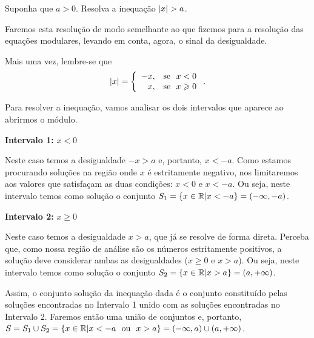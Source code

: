 \begin{exem}
   Suponha que $a> 0$. Resolva a inequação $\left|x\right| > a$.

Faremos esta resolução de modo semelhante ao que fizemos para a resolução das equações modulares, levando em conta, agora, o sinal da desigualdade.

Mais uma vez, lembre-se que 
 \[
\left|x\right|= \left\{\begin{array}{rl}
      -x , & \text{se} \ \ x<0 \\
      x , & \text{se} \ \ x \geqslant 0
     \end{array}\right. .
\]

Para resolver a inequação, vamos analisar os dois intervalos que aparece ao abrirmos o módulo.

\textbf{Intervalo 1:} $x < 0$

Neste caso temos a desigualdade $-x > a$ e, portanto, $x < -a$. Como estamos procurando soluções na região onde $x$ é estritamente negativo, nos limitaremos aos valores que satisfaçam as duas condições: $x < 0$ e $x < -a$. Ou seja, neste intervalo temos como solução o conjunto $S_1 = \{x \in \mathbb{R} | x < -a\} = (-\infty, -a)$.

\textbf{Intervalo 2:} $x\geq 0$

Neste caso temos a desigualdade $x>a$, que já se resolve de forma direta. Perceba que, como nossa região de análise são os números estritamente positivos, a solução deve considerar ambas as desigualdades ($x \geq 0$ e $x > a$). Ou seja, neste intervalo temos como solução o conjunto $S_2 = \{x \in \mathbb{R} | x > a\} = (a, +\infty)$.

Assim, o conjunto solução da inequação dada é o conjunto constituído pelas soluções encontradas no Intervalo 1 unido com as soluções encontradas no Intervalo 2. Faremos então uma união de conjuntos e, portanto, $S = S_1 \cup S_2 = \{x \in \mathbb{R}| x < -a \ \ \mbox{ou} \ \ x > a\} = (-\infty,a) \cup (a, + \infty)$.

\begin{comment}
\begin{equation*}
\abs{x} > a \Leftrightarrow \abs{x}^2 > a^2 \Leftrightarrow x^2 > a^2
\end{equation*}
   mas,
\begin{equation*}
x^2 > a^2 \Leftrightarrow x^2 - a^2 > 0 \Leftrightarrow (x-a)(x+a) > 0 \ .
\end{equation*}
   Vamos então analisar quando $(x-a)(x+a) > 0$. Lembremos que produto de dois números é positivo quando eles tem o mesmo sinal, com isso a inequação $(x-a)(x+a) > 0$ é satisfeita em duas situações:\\
   Caso 1: $x-a< 0$ e $x+a< 0$
\begin{equation*}
x-a< 0 \Rightarrow x< a
\end{equation*}
   e
\begin{equation*}
x+a< 0 \Rightarrow x< -a \ .
\end{equation*}
  Fazendo a interseção dos conjuntos $A_1= \left\{ x \in \R \mid x<a \right\}$ e $B_1= \left\{ x \in \R \mid x< -a \right\}$, obtemos $A_1 \cap B_1= \left\{ x \in \R \mid x< -a \right\}$. O conjunto $A_1 \cap B_1$ é o conjunto solução da inequação neste caso.



\end{comment}
\end{exem}
